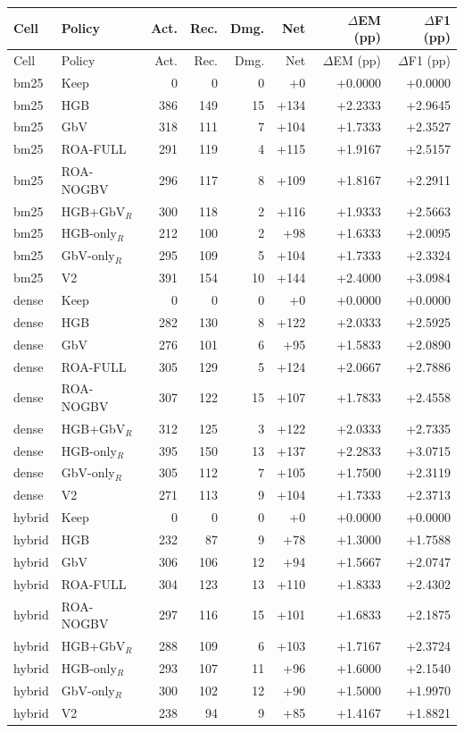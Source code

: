 \begin{longtable}{llrrrrrr}
\toprule
Cell & Policy & Act. & Rec. & Dmg. & Net & $\Delta$EM (pp) & $\Delta$F1 (pp) \\
\midrule
\endfirsthead
\toprule
Cell & Policy & Act. & Rec. & Dmg. & Net & $\Delta$EM (pp) & $\Delta$F1 (pp) \\
\midrule
\endhead
bm25 & Keep & 0 & 0 & 0 & +0 & +0.0000 & +0.0000 \\
bm25 & HGB & 386 & 149 & 15 & +134 & +2.2333 & +2.9645 \\
bm25 & GbV & 318 & 111 & 7 & +104 & +1.7333 & +2.3527 \\
bm25 & ROA-FULL & 291 & 119 & 4 & +115 & +1.9167 & +2.5157 \\
bm25 & ROA-NOGBV & 296 & 117 & 8 & +109 & +1.8167 & +2.2911 \\
bm25 & HGB+GbV$_R$ & 300 & 118 & 2 & +116 & +1.9333 & +2.5663 \\
bm25 & HGB-only$_R$ & 212 & 100 & 2 & +98 & +1.6333 & +2.0095 \\
bm25 & GbV-only$_R$ & 295 & 109 & 5 & +104 & +1.7333 & +2.3324 \\
bm25 & V2 & 391 & 154 & 10 & +144 & +2.4000 & +3.0984 \\
dense & Keep & 0 & 0 & 0 & +0 & +0.0000 & +0.0000 \\
dense & HGB & 282 & 130 & 8 & +122 & +2.0333 & +2.5925 \\
dense & GbV & 276 & 101 & 6 & +95 & +1.5833 & +2.0890 \\
dense & ROA-FULL & 305 & 129 & 5 & +124 & +2.0667 & +2.7886 \\
dense & ROA-NOGBV & 307 & 122 & 15 & +107 & +1.7833 & +2.4558 \\
dense & HGB+GbV$_R$ & 312 & 125 & 3 & +122 & +2.0333 & +2.7335 \\
dense & HGB-only$_R$ & 395 & 150 & 13 & +137 & +2.2833 & +3.0715 \\
dense & GbV-only$_R$ & 305 & 112 & 7 & +105 & +1.7500 & +2.3119 \\
dense & V2 & 271 & 113 & 9 & +104 & +1.7333 & +2.3713 \\
hybrid & Keep & 0 & 0 & 0 & +0 & +0.0000 & +0.0000 \\
hybrid & HGB & 232 & 87 & 9 & +78 & +1.3000 & +1.7588 \\
hybrid & GbV & 306 & 106 & 12 & +94 & +1.5667 & +2.0747 \\
hybrid & ROA-FULL & 304 & 123 & 13 & +110 & +1.8333 & +2.4302 \\
hybrid & ROA-NOGBV & 297 & 116 & 15 & +101 & +1.6833 & +2.1875 \\
hybrid & HGB+GbV$_R$ & 288 & 109 & 6 & +103 & +1.7167 & +2.3724 \\
hybrid & HGB-only$_R$ & 293 & 107 & 11 & +96 & +1.6000 & +2.1540 \\
hybrid & GbV-only$_R$ & 300 & 102 & 12 & +90 & +1.5000 & +1.9970 \\
hybrid & V2 & 238 & 94 & 9 & +85 & +1.4167 & +1.8821 \\
\bottomrule
\end{longtable}

